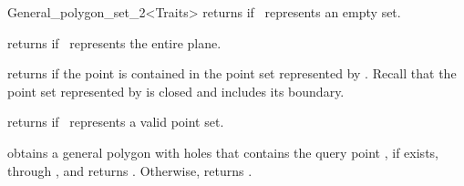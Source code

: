 \begin{ccRefClass}{General_polygon_set_2<Traits>}
  {returns  if \ccVar\ represents an empty set.}

  {returns  if \ccVar\ represents the entire plane.}

  {returns  if the point  is contained in the point set
   represented by \ccVar. Recall that the point set represented by 
   is closed and includes its boundary.}

  {returns  if \ccVar\ represents a valid point set.}

% 
  {obtains a general polygon with holes that contains the query point
  , if exists, through , and returns
  . Otherwise, returns .}

\ccSeeAlso
  \\
  \\

\end{ccRefClass}

\ccRefPageEnd
